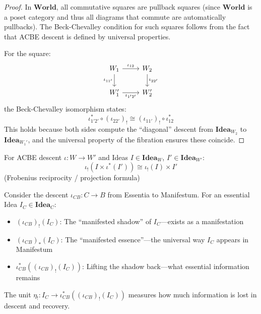\begin{proof}
In $\mathbf{World}$, all commutative squares are pullback squares (since
$\mathbf{World}$ is a poset category and thus all diagrams that commute
are automatically pullbacks). The Beck-Chevalley condition for such
squares follows from the fact that ACBE descent is defined by universal
properties.

For the square:
\[
\begin{tikzcd}
  W_1 \arrow[r, "\iota_{12}"] \arrow[d, "\iota_{11'}"'] & W_2 \arrow[d, "\iota_{22'}"] \\
  W_1' \arrow[r, "\iota_{1'2'}"'] & W_2'
\end{tikzcd}
\]
the Beck-Chevalley isomorphism states:
\[
  \iota_{1'2'}^* \circ (\iota_{22'})_! \cong (\iota_{11'})_! \circ \iota_{12}^*
\]
This holds because both sides compute the ``diagonal'' descent from
$\mathbf{Idea}_{W_2}$ to $\mathbf{Idea}_{W_1'}$, and the universal property
of the fibration ensures these coincide.
\end{proof}

\begin{corollary}
\label{cor:frobenius-reciprocity}
For ACBE descent $\iota : W \to W'$ and Ideas $I \in \mathbf{Idea}_W$,
$I' \in \mathbf{Idea}_{W'}$:
\[
  \iota_!(I \times \iota^*(I')) \cong \iota_!(I) \times I'
\]
(Frobenius reciprocity / projection formula)
\end{corollary}

\begin{example}
\label{ex:base-change-acbe}
Consider the descent $\iota_{CB} : C \to B$ from Essentia to Manifestum.
For an essential Idea $I_C \in \mathbf{Idea}_C$:
\begin{itemize}
  \item $(\iota_{CB})_!(I_C)$: The ``manifested shadow'' of $I_C$---exists
        as a manifestation
  \item $(\iota_{CB})_*(I_C)$: The ``manifested essence''---the universal
        way $I_C$ appears in Manifestum
  \item $\iota_{CB}^*((\iota_{CB})_!(I_C))$: Lifting the shadow back---what
        essential information remains
\end{itemize}
The unit $\eta_! : I_C \to \iota_{CB}^*((\iota_{CB})_!(I_C))$ measures how
much information is lost in descent and recovery.
\end{example}

